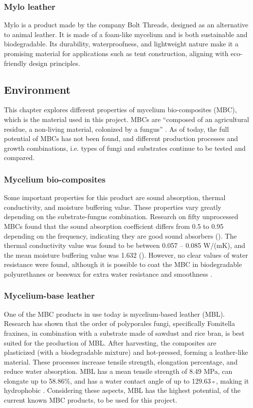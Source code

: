 \documentclass{article}
\begin{document}
\subsubsection{Mylo leather}
Mylo is a product made by the company Bolt Threads, designed as an alternative to animal
leather. It is made of a foam-like mycelium \parencite{myloleather} and
is both sustainable and biodegradable. Its durability, waterproofness, and lightweight
nature make it a promising material for applications such as tent construction, aligning
with eco-friendly design principles.

\subsection{Environment}
This chapter explores different properties of mycelium bio-composites (MBC), which is the
material used in this project. MBCs are ``composed of an agricultural residue, a non-living
material, colonized by a fungus'' \parencite{amziane2023bio, p. 740}. As of today, the full
potential of MBCs has not been found, and different production processes and growth
combinations, i.e. types of fungi and substrates continue to be tested and compared.

\subsubsection{Mycelium bio-composites}
Some important properties for this product are sound absorption, thermal conductivity, and
moisture buffering value. These properties vary greatly depending on the substrate-fungus
combination. Research on fifty unprocessed MBCs found that the sound absorption coefficient
differs from 0.5 to 0.95 depending on the frequency, indicating they are good sound
absorbers (\cite{amziane2023bio, p.749}). The thermal conductivity value was found to be
between 0.057 -- 0.085 W/(mK), and the mean moisture buffering value was 1.632
(\cite{amziane2023bio, p.749}). However, no clear values of water resistance were found,
although it is possible to coat the MBC in biodegradable polyurethanes or beeswax for
extra water resistance and smoothness \parencite{amziane2023bio}.

\subsubsection{Mycelium-base leather}
One of the MBC products in use today is mycelium-based leather (MBL). Research has shown
that the order of polyporales fungi, specifically Fomitella fraxinea, in combination with
a substrate made of sawdust and rice bran, is best suited for the production of MBL. After
harvesting, the composites are plasticized (with a biodegradable mixture) and hot-pressed,
forming a leather-like material. These processes increase tensile strength, elongation
percentage, and reduce water absorption. MBL has a mean tensile strength of 8.49 MPa, can
elongate up to 58.86\%, and has a water contact angle of up to 129.63◦, making it
hydrophobic \parencite{jof8030317}. Considering these aspects, MBL has the highest
potential, of the current known MBC products, to be used for this project. 
\end{document}
